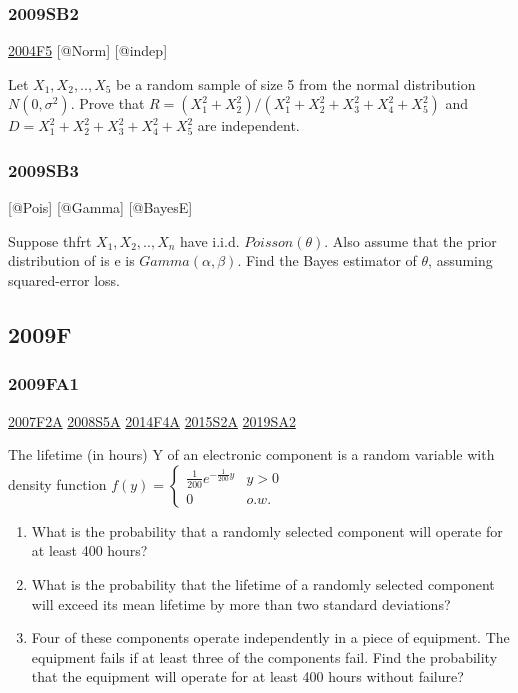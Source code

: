 \documentclass[6pt,twocolumn,Portrait]{article}
\begin{document}
\hypertarget{sb2}{%
\subsubsection{2009SB2}\label{sb2}}

\protect\hyperlink{f5-2}{2004F5} {[}@Norm{]} {[}@indep{]}

Let \(X_1,X_2,..,X_5\) be a random sample of size 5 from the normal
distribution \(N(0,\sigma^2)\). Prove that
\(R=(X_1^2+ X_2^2)/(X_1^2+ X_2^2+X_3^2+ X_4^2+X_5^2)\) and
\(D=X_1^2+ X_2^2+X_3^2+ X_4^2+X_5^2\) are independent.

\hypertarget{sb3}{%
\subsubsection{2009SB3}\label{sb3}}

{[}@Pois{]} {[}@Gamma{]} {[}@BayesE{]}

Suppose thfrt \(X_1,X_2,..,X_{n}\) have i.i.d. \(Poisson(\theta)\). Also
assume that the prior distribution of is e is \(Gamma(\alpha,\beta)\).
Find the Bayes estimator of \(\theta\), assuming squared-error loss.

\hypertarget{f-5}{%
\subsection{2009F}\label{f-5}}

\hypertarget{fa1}{%
\subsubsection{2009FA1}\label{fa1}}

\protect\hyperlink{f2a}{2007F2A} \protect\hyperlink{s5a}{2008S5A}
\protect\hyperlink{f4a-1}{2014F4A} \protect\hyperlink{s2a-1}{2015S2A}
\protect\hyperlink{sa2-3}{2019SA2}

The lifetime (in hours) Y of an electronic component is a random
variable with density function
\(f(y)=\begin{cases}\frac1{200}e^{-\frac1{200}y}& y>0\\0& o.w.\end{cases}\)

\begin{enumerate}
\def\labelenumi{(\alph{enumi})}
\item
  What is the probability that a randomly selected component will
  operate for at least 400 hours?
\item
  What is the probability that the lifetime of a randomly selected
  component will exceed its mean lifetime by more than two standard
  deviations?
\item
  Four of these components operate independently in a piece of
  equipment. The equipment fails if at least three of the components
  fail. Find the probability that the equipment will operate for at
  least 400 hours without failure?
\end{enumerate}
\end{document}
